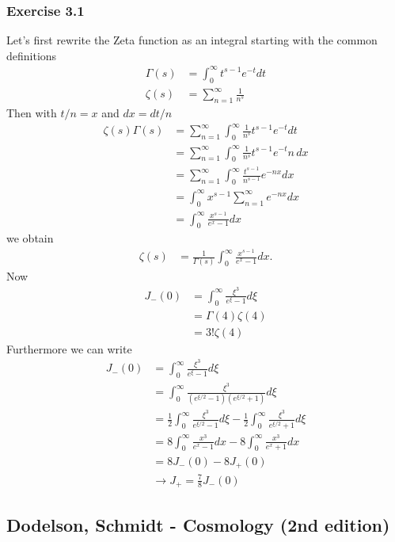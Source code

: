 \documentclass[10pt,a4paper]{book}
\theoremstyle{definition}
\begin{document}
\subsubsection{Exercise 3.1}
Let's first rewrite the Zeta function as an integral starting with the common definitions
\begin{align}
    \Gamma(s)&=\int_0^\infty t^{s-1}e^{-t} dt\\
    \zeta(s)&=\sum_{n=1}^\infty\frac{1}{n^s}
\end{align}
Then with $t/n=x$ and $dx=dt/n$
\begin{align}
	\zeta(s)\Gamma(s)
	&=\sum_{n=1}^\infty\int_0^\infty \frac{1}{n^s}t^{s-1}e^{-t} dt\\
	&=\sum_{n=1}^\infty\int_0^\infty \frac{1}{n^s}t^{s-1}e^{-t} n\,dx\\
	&=\sum_{n=1}^\infty\int_0^\infty \frac{t^{s-1}}{n^{s-1}}e^{-nx} dx\\
	&=\int_0^\infty x^{s-1}\sum_{n=1}^\infty e^{-nx} dx\\
	&=\int_0^\infty \frac{x^{s-1}}{e^{x}-1} dx
\end{align}
we obtain
\begin{align}
\zeta(s)&=\frac{1}{\Gamma(s)}\int_0^\infty \frac{x^{s-1}}{e^{x}-1} dx.
\end{align}
Now
\begin{align}
J_{-}(0)&=\int_0^\infty\frac{\xi^3}{e^\xi-1}d\xi\\
&=\Gamma(4)\zeta(4)\\
&=3!\zeta(4)
\end{align}
Furthermore we can write
\begin{align}
J_{-}(0)
&=\int_0^\infty\frac{\xi^3}{e^\xi-1}d\xi\\
&=\int_0^\infty\frac{\xi^3}{(e^{\xi/2}-1)(e^{\xi/2}+1)}d\xi\\
&=\frac{1}{2}\int_0^\infty\frac{\xi^3}{e^{\xi/2}-1}d\xi-\frac{1}{2}\int_0^\infty\frac{\xi^3}{e^{\xi/2}+1}d\xi\\
&=8\int_0^\infty\frac{x^3}{e^{x}-1}dx-8\int_0^\infty\frac{x^3}{e^{x}+1}dx\\
&=8J_{-}(0)-8J_{+}(0)\\
&\rightarrow J_{+}=\frac{7}{8}J_{-}(0)
\end{align}



\newpage
\subsection{{\sc Dodelson, Schmidt} - Cosmology (2nd edition)}
\end{document}
